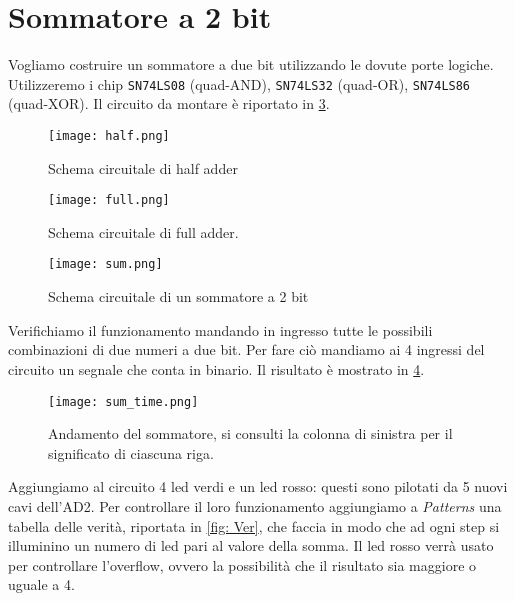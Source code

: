 \documentclass[10pt, a4paper, italian]{article}
\begin{document}

\section{Sommatore a 2 bit}
Vogliamo costruire un sommatore a due bit utilizzando le dovute porte logiche. Utilizzeremo i chip \texttt{SN74LS08} (quad-AND), \texttt{SN74LS32} (quad-OR), \texttt{SN74LS86} (quad-XOR). Il circuito da montare è riportato in \cref{fig: sommatore}.

\begin{figure}[htbp]
    \centering
    \texttt{[image: half.png]}
    \caption{Schema circuitale di half adder}
    \label{fig:halfadder}
\end{figure}

\begin{figure}[htbp]
    \centering
    \texttt{[image: full.png]}
    \caption{Schema circuitale di full adder.}
    \label{fig:fulladder}
\end{figure}

\begin{figure}[htbp]
    \centering
    \texttt{[image: sum.png]}
    \caption{Schema circuitale di un sommatore a 2 bit}
    \label{fig: sommatore}
\end{figure}

Verifichiamo il funzionamento mandando in ingresso tutte le possibili combinazioni di due numeri a due bit. Per fare ciò mandiamo ai 4 ingressi del circuito un segnale che conta in binario. Il risultato è mostrato in \cref{fig: faAD2}.

\begin{figure}[htbp]
    \centering
    \texttt{[image: sum\_time.png]}
    \caption{Andamento del sommatore, si consulti la colonna di sinistra per il significato di ciascuna riga.}
    \label{fig: faAD2}
\end{figure}

Aggiungiamo al circuito 4 led verdi e un led rosso: questi sono pilotati da 5 nuovi cavi dell'AD2. Per controllare il loro funzionamento aggiungiamo a \emph{Patterns} una tabella delle verità, riportata in \cref{fig: Ver}, che faccia in modo che ad ogni step si illuminino un numero di led pari al valore della somma. Il led rosso verrà usato per controllare l'overflow, ovvero la possibilità che il risultato sia maggiore o uguale a 4.
\end{document}

